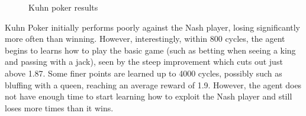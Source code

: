 \documentclass[pdftex,twoside,a4paper]{report}
\begin{document}
\begin{figure}[h]
  \begin{center}
  \end{center}
  \caption{Kuhn poker results}
  \label{fig:kuhn_results}
\end{figure}

Kuhn Poker initially performs poorly against the Nash player, losing significantly more often than winning. However, interestingly, within 800 cycles, the agent begins to learns how to play the basic game (such as betting when seeing a king and passing with a jack), seen by the steep improvement which cuts out just above 1.87. Some finer points are learned up to 4000 cycles, possibly such as bluffing with a queen, reaching an average reward of 1.9. However, the agent does not have enough time to start learning how to exploit the Nash player and still loses more times than it wins.
\end{document}
